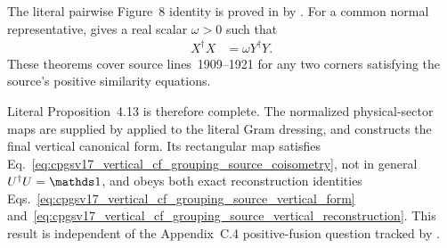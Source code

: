 \documentclass{article}
\begin{document}
The literal pairwise Figure~8 identity is proved in
 by
.
For a common normal representative,
gives a real scalar $\omega>0$ such that
\begin{align}
    X^\dagger X
     & =\omega Y^\dagger Y.
    \label{eq:cpgsv17_vertical_cf_grouping_literal_pairwise_gram}
\end{align}
These theorems cover source lines~1909--1921 for any two corners satisfying
the source's positive similarity equations.

Literal Proposition~4.13 is therefore complete. The normalized physical-sector
maps are supplied by
 applied to
the literal Gram dressing, and
 constructs the final vertical
canonical form. Its rectangular map satisfies
Eq.~\ref{eq:cpgsv17_vertical_cf_grouping_source_coisometry}, not in general
$U^\dagger U=\Id$, and obeys both exact reconstruction identities
Eqs.~\ref{eq:cpgsv17_vertical_cf_grouping_source_vertical_form}
and~\ref{eq:cpgsv17_vertical_cf_grouping_source_vertical_reconstruction}. This
result is independent of the Appendix~C.4 positive-fusion question tracked by
.


\end{document}

